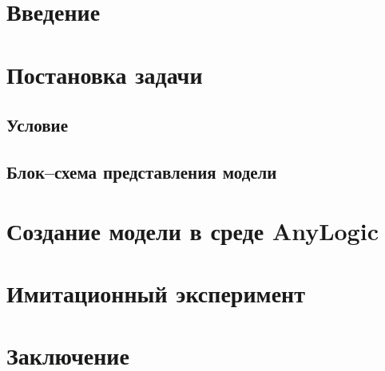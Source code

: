 

\def\oldbibitem{}
\let\oldbibitem=\bibitem
\def\bibitem{\stepcounter{citenum}\oldbibitem}




\tableofcontents
\newpage
\section{Введение}

\section{Постановка задачи}
\subsection{Условие}
\subsection{Блок--схема представления модели}
\section{Создание модели в среде AnyLogic}
\section{Имитационный эксперимент}
\section{Заключение}



